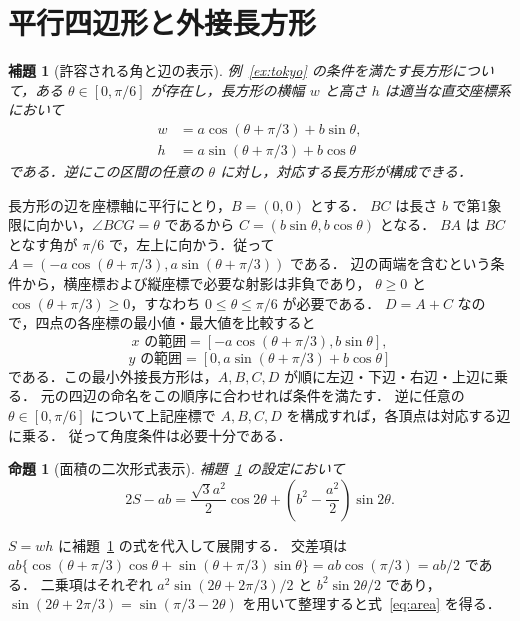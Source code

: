 \documentclass[a5paper,10pt,onecolumn]{jsarticle}
\makeatletter
\theoremstyle{mathnotetheorem}
\newtheorem{lemma}[theorem]{補題}
\newtheorem{proposition}[theorem]{命題}
\renewcommand{\proofname}{証明}
\renewenvironment{proof}[1][\proofname]{%
  \par\pushQED{\qed}\normalfont\topsep4\p@\@plus2\p@\relax
  \trivlist\item[\hskip\labelsep\bfseries #1]\ignorespaces
}{\popQED\endtrivlist\@endpefalse}
\makeatother
\begin{document}
\section{平行四辺形と外接長方形}
\begin{lemma}[許容される角と辺の表示]\label{lem:geometry}
例~\ref{ex:tokyo} の条件を満たす長方形について，ある $\theta\in[0,\pi/6]$ が存在し，長方形の横幅 $w$ と高さ $h$ は適当な直交座標系において
\begin{align*}
 w&=a\cos(\theta+\pi/3)+b\sin\theta,\\
 h&=a\sin(\theta+\pi/3)+b\cos\theta
\end{align*}
である．逆にこの区間の任意の $\theta$ に対し，対応する長方形が構成できる．
\end{lemma}
\begin{proof}
長方形の辺を座標軸に平行にとり，$B=(0,0)$ とする．
$BC$ は長さ $b$ で第1象限に向かい，$\angle BCG=\theta$ であるから
$C=(b\sin\theta,b\cos\theta)$ となる．
$BA$ は $BC$ となす角が $\pi/6$ で，左上に向かう．従って
$A=(-a\cos(\theta+\pi/3),a\sin(\theta+\pi/3))$ である．
辺の両端を含むという条件から，横座標および縦座標で必要な射影は非負であり，
$\theta\ge0$ と $\cos(\theta+\pi/3)\ge0$，すなわち $0\le\theta\le\pi/6$ が必要である．
$D=A+C$ なので，四点の各座標の最小値・最大値を比較すると
\[
 x\text{ の範囲}=[-a\cos(\theta+\pi/3),b\sin\theta],
\]
\[
 y\text{ の範囲}=[0,a\sin(\theta+\pi/3)+b\cos\theta]
\]
である．この最小外接長方形は，$A,B,C,D$ が順に左辺・下辺・右辺・上辺に乗る．
元の四辺の命名をこの順序に合わせれば条件を満たす．
逆に任意の $\theta\in[0,\pi/6]$ について上記座標で $A,B,C,D$ を構成すれば，各頂点は対応する辺に乗る．
従って角度条件は必要十分である．
\end{proof}

\begin{proposition}[面積の二次形式表示]\label{prop:area}
補題~\ref{lem:geometry} の設定において
\begin{equation}\label{eq:area}
 2S-ab=\frac{\sqrt3 a^2}{2}\cos2\theta
 +\left(b^2-\frac{a^2}{2}\right)\sin2\theta.
\end{equation}
\end{proposition}
\begin{proof}
$S=wh$ に補題~\ref{lem:geometry} の式を代入して展開する．
交差項は
$ab\{\cos(\theta+\pi/3)\cos\theta+\sin(\theta+\pi/3)\sin\theta\}
=ab\cos(\pi/3)=ab/2$ である．
二乗項はそれぞれ $a^2\sin(2\theta+2\pi/3)/2$ と $b^2\sin2\theta/2$ であり，
$\sin(2\theta+2\pi/3)=\sin(\pi/3-2\theta)$ を用いて整理すると式~\eqref{eq:area} を得る．
\end{proof}
\end{document}
